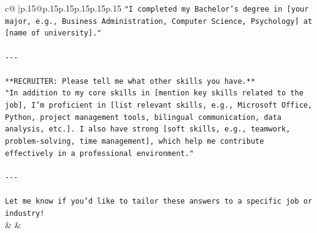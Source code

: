 \documentclass{article}
\begin{document}
{\begin{supertabular}{c@{$\;$}|p{.15\linewidth}@{}p{.15\linewidth}p{.15\linewidth}p{.15\linewidth}p{.15\linewidth}p{.15\linewidth}}
{{{\texttt{"I completed my Bachelor’s degree in {[}your major, e.g., Business Administration, Computer Science, Psychology{]} at {[}name of university{]}."} \\
\\ 
\texttt{{-}{-}{-}} \\
\\ 
\texttt{**RECRUITER: Please tell me what other skills you have.**  } \\
\texttt{"In addition to my core skills in {[}mention key skills related to the job{]}, I’m proficient in {[}list relevant skills, e.g., Microsoft Office, Python, project management tools, bilingual communication, data analysis, etc.{]}. I also have strong {[}soft skills, e.g., teamwork, problem{-}solving, time management{]}, which help me contribute effectively in a professional environment."} \\
\\ 
\texttt{{-}{-}{-}} \\
\\ 
\texttt{Let me know if you'd like to tailor these answers to a specific job or industry!} \\
            }
        }
    }
    & & \\ \\


\end{supertabular}}
\end{document}
